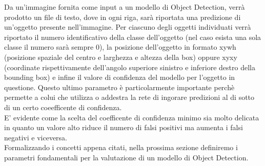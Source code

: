\documentclass[12pt,a4paper,openright,twoside]{report}
\begin{document}
Da un'immagine fornita come input a un modello di Object Detection, verrà prodotto un file di testo, dove in ogni riga, sarà riportata una predizione di un'oggetto presente nell'immagine.
Per ciascuno degli oggetti individuati verrà riportato il numero identificativo della classe dell'oggetto (nel caso esista una sola classe il numero sarà sempre 0), la posizione dell'oggetto in formato xywh (posizione spaziale del centro e larghezza e altezza della box) oppure xyxy (coordinate rispettivamente dell'angolo superiore sinistro e inferiore destro della bounding box) e infine il valore di confidenza del modello per l'oggetto in questione. Questo ultimo parametro è particolarmente importante perchè permette a colui che utilizza o addestra la rete di ingorare predizioni al di sotto di un certo coeefficente di confidenza.\\ E' evidente come la scelta del coefficente di confidenza minimo sia molto delicata in quanto un valore alto riduce il numero di falsi positivi ma aumenta i falsi negativi e viceversa.\\
Formalizzando i concetti appena citati, nella prossima sezione definiremo i parametri fondamentali per la valutazione di un modello di Object Detection.
\end{document}
